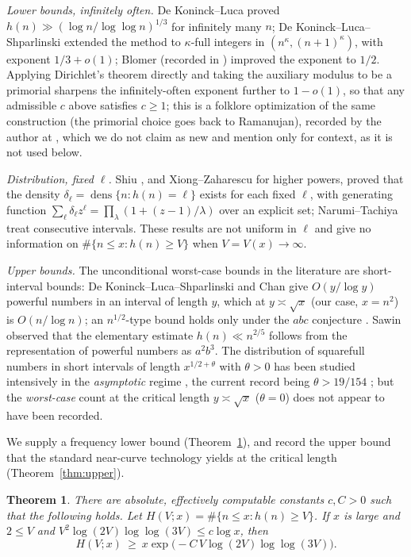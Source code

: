 \documentclass[11pt]{article}
\newtheorem{theorem}{Theorem}
\theoremstyle{definition}
\begin{document}
\emph{Lower bounds, infinitely often.} De Koninck--Luca \cite{DeLu04} proved
$h(n)\gg(\log n/\log\log n)^{1/3}$ for infinitely many $n$; De Koninck--Luca--Shparlinski \cite{DLS} extended
the method to $\kappa$-full integers in $(n^\kappa,(n+1)^\kappa)$, with exponent $1/3+o(1)$; Blomer (recorded
in \cite[Appendix~A]{MSY}) improved the exponent to $1/2$. Applying Dirichlet's theorem directly and taking
the auxiliary modulus to be a primorial sharpens the infinitely-often exponent further to $1-o(1)$, so that
any admissible $c$ above satisfies $c\ge1$; this is a folklore optimization of the same construction (the
primorial choice goes back to Ramanujan), recorded by the author at \cite{Erdos942}, which we do not claim as
new and mention only for context, as it is not used below.

\emph{Distribution, fixed $\ell$.} Shiu \cite{Shiu}, and Xiong--Zaharescu \cite{XZ} for higher powers, proved
that the density $\delta_\ell=\operatorname{dens}\{n:h(n)=\ell\}$ exists for each fixed $\ell$, with
generating function $\sum_\ell\delta_\ell z^\ell=\prod_\lambda(1+(z-1)/\lambda)$ over an explicit set;
Narumi--Tachiya \cite{NT} treat consecutive intervals. These results are not uniform in $\ell$ and give no
information on $\#\{n\le x:h(n)\ge V\}$ when $V=V(x)\to\infty$.

\emph{Upper bounds.} The unconditional worst-case bounds in the literature are short-interval bounds: De
Koninck--Luca--Shparlinski \cite{DLS} and Chan \cite{Chan} give $O(y/\log y)$ powerful numbers in an interval
of length $y$, which at $y\asymp\sqrt x$ (our case, $x=n^2$) is $O(n/\log n)$; an $n^{1/2}$-type bound holds
only under the $abc$ conjecture \cite[Thm.~2]{DLS}. Sawin observed \cite{Erdos942} that the elementary
estimate $h(n)\ll n^{2/5}$ follows from the representation of powerful numbers as $a^2b^3$. The distribution
of squarefull numbers in short intervals of length $x^{1/2+\theta}$ with $\theta>0$ has been studied
intensively in the \emph{asymptotic} regime \cite{Shiu,FT94,HT96,Tri02}, the current record being
$\theta>19/154$ \cite{Tri02}; but the \emph{worst-case} count at the critical length $y\asymp\sqrt x$
($\theta=0$) does not appear to have been recorded.

We supply a frequency lower bound (Theorem~\ref{thm:main}), and record the upper bound that the standard
near-curve technology yields at the critical length (Theorem~\ref{thm:upper}).

\begin{theorem}\label{thm:main}
There are absolute, effectively computable constants $c,C>0$ such that the following holds. Let
$H(V;x)=\#\{n\le x:h(n)\ge V\}$. If $x$ is large and $2\le V$ and
$V^2\log(2V)\log\log(3V)\le c\log x$, then
\[
  H(V;x)\ \ge\ x\exp\!\bigl(-C\,V\log(2V)\log\log(3V)\bigr).
\]
\end{theorem}
\end{document}
